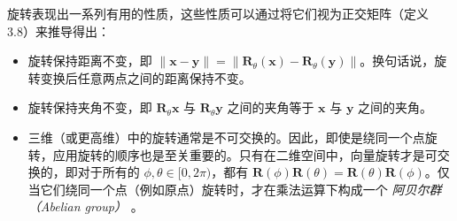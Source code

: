 旋转表现出一系列有用的性质，这些性质可以通过将它们视为正交矩阵（定义 3.8）来推导得出：

\begin{itemize}
\item 旋转保持距离不变，即 $ \|\boldsymbol{x} - \boldsymbol{y}\| = \|\boldsymbol{R}_\theta(\boldsymbol{x}) - \boldsymbol{R}_\theta(\boldsymbol{y})\| $。换句话说，旋转变换后任意两点之间的距离保持不变。
\item 旋转保持夹角不变，即 $ \boldsymbol{R}_\theta \boldsymbol{x} $ 与 $ \boldsymbol{R}_\theta \boldsymbol{y} $ 之间的夹角等于 $ \boldsymbol{x} $ 与 $ \boldsymbol{y} $ 之间的夹角。
\item 三维（或更高维）中的旋转通常是不可交换的。因此，即使是绕同一个点旋转，应用旋转的顺序也是至关重要的。只有在二维空间中，向量旋转才是可交换的，即对于所有的 $ \phi, \theta \in [0, 2\pi) $，都有 $ \boldsymbol{R}(\phi)\boldsymbol{R}(\theta) = \boldsymbol{R}(\theta)\boldsymbol{R}(\phi) $。仅当它们绕同一个点（例如原点）旋转时，才在乘法运算下构成一个 \emph{阿贝尔群（Abelian group）} 。
\end{itemize}
